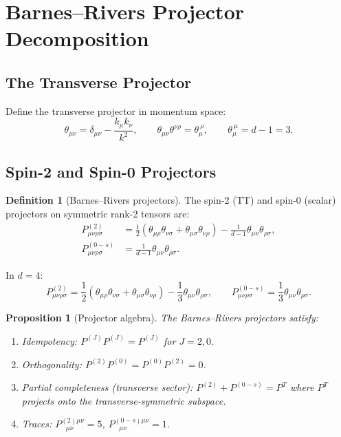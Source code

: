 \documentclass[11pt,a4paper]{article}
\theoremstyle{plain}
\newtheorem{proposition}[theorem]{Proposition}
\theoremstyle{definition}
\newtheorem{definition}[theorem]{Definition}
\begin{document}
\section{Barnes--Rivers Projector Decomposition}\label{sec:projectors}

\subsection{The Transverse Projector}

Define the transverse projector in momentum space:
\begin{equation}\label{eq:theta}
  \theta_{\mu\nu} = \delta_{\mu\nu} - \frac{k_\mu k_\nu}{k^2},
  \qquad
  \theta_{\mu\nu}\theta^{\nu\rho} = \theta_\mu^{\ \rho},
  \qquad
  \theta_\mu^{\ \mu} = d - 1 = 3.
\end{equation}

\subsection{Spin-2 and Spin-0 Projectors}

\begin{definition}[Barnes--Rivers projectors]\label{def:BR}
The spin-2 (TT) and spin-0 (scalar) projectors on symmetric
rank-2 tensors are:
\begin{align}
  P^{(2)}_{\mu\nu\rho\sigma} &= \frac{1}{2}
  (\theta_{\mu\rho}\theta_{\nu\sigma} + \theta_{\mu\sigma}\theta_{\nu\rho})
  - \frac{1}{d-1}\theta_{\mu\nu}\theta_{\rho\sigma},
  \label{eq:P2}\\
  P^{(0-s)}_{\mu\nu\rho\sigma} &= \frac{1}{d-1}
  \theta_{\mu\nu}\theta_{\rho\sigma}.
  \label{eq:P0}
\end{align}
\end{definition}

In $d = 4$:
\begin{equation}
  P^{(2)}_{\mu\nu\rho\sigma} = \frac{1}{2}
  (\theta_{\mu\rho}\theta_{\nu\sigma} + \theta_{\mu\sigma}\theta_{\nu\rho})
  - \frac{1}{3}\theta_{\mu\nu}\theta_{\rho\sigma},
  \qquad
  P^{(0-s)}_{\mu\nu\rho\sigma} = \frac{1}{3}
  \theta_{\mu\nu}\theta_{\rho\sigma}.
\end{equation}

\begin{proposition}[Projector algebra]\label{prop:BR-algebra}
The Barnes--Rivers projectors satisfy:
\begin{enumerate}[nosep,label=(\roman*)]
  \item Idempotency: $P^{(J)} P^{(J)} = P^{(J)}$ for $J = 2, 0$.
  \item Orthogonality: $P^{(2)} P^{(0)} = P^{(0)} P^{(2)} = 0$.
  \item Partial completeness (transverse sector):
    $P^{(2)} + P^{(0-s)} = P^{T}$ where $P^T$ projects onto
    the transverse-symmetric subspace.
  \item Traces: $P^{(2)\mu\nu}_{\ \ \ \mu\nu} = 5$,
    $P^{(0-s)\mu\nu}_{\ \ \ \mu\nu} = 1$.
\end{enumerate}
\end{proposition}
\end{document}
